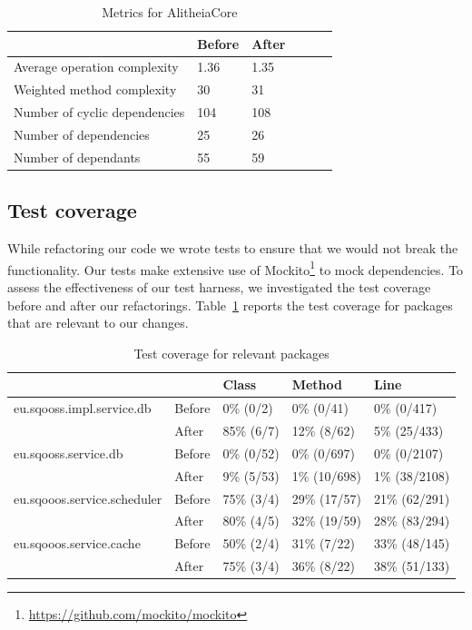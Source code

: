\documentclass{article}
\begin{document}
\begin{table}
	\centering
    \begin{tabular}{l|llll}
    ~                                 & Before & After & ~ & ~ \\ \hline
    Average operation complexity      & 1.36   & 1.35 \\
    Weighted method complexity        & 30     & 31 \\
    Number of cyclic dependencies     & 104 & 108 \\
    Number of dependencies            & 25  & 26  \\
    Number of dependants              & 55  & 59  \\
    \end{tabular}
    \caption{Metrics for AlitheiaCore}
\end{table}

\subsection{Test coverage}
While refactoring our code we wrote tests to ensure that we would not break the functionality. Our tests make extensive use of Mockito\footnote{\url{https://github.com/mockito/mockito}} to mock dependencies. To assess the effectiveness of our test harness, we investigated the test coverage before and after our refactorings. Table~\ref{tbl:coverage} reports the test coverage for packages that are relevant to our changes.

\begin{table}[h]
	\centering
    \begin{tabular}{ll|lll}
    ~                           & ~      & Class      & Method       & Line         \\ \hline
    eu.sqooss.impl.service.db   & Before & 0\% (0/2)  & 0\% (0/41)   & 0\% (0/417) \\
    ~                           & After  & 85\% (6/7) & 12\% (8/62)  & 5\% (25/433) \\ \hline
    eu.sqooss.service.db        & Before & 0\% (0/52) & 0\% (0/697)  & 0\% (0/2107) \\
    ~                           & After  & 9\% (5/53) & 1\% (10/698) & 1\% (38/2108) \\ \hline
    eu.sqooos.service.scheduler & Before & 75\% (3/4) & 29\% (17/57) & 21\% (62/291) \\
    ~                           & After  & 80\% (4/5) & 32\% (19/59) & 28\% (83/294) \\ \hline
    eu.sqooos.service.cache     & Before & 50\% (2/4) & 31\% (7/22)  & 33\% (48/145) \\
    ~                           & After  & 75\% (3/4) & 36\% (8/22)  & 38\% (51/133)

    \end{tabular}
    \caption{Test coverage for relevant packages}
    \label{tbl:coverage}
\end{table}



\end{document}
